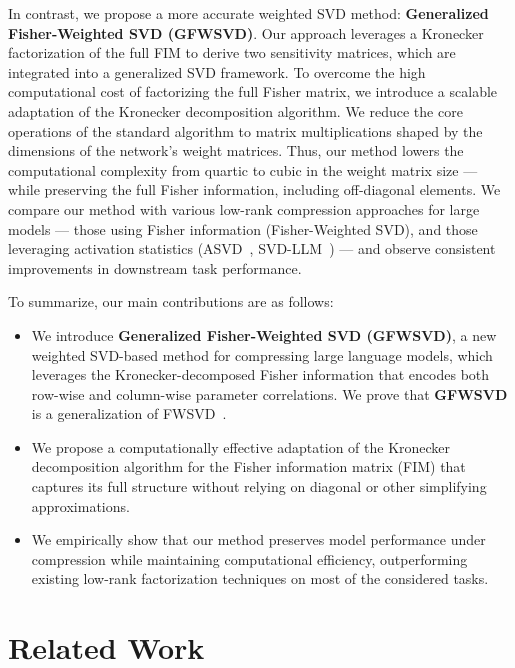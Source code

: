 \documentclass{article}
\begin{document}
In contrast, we propose a more accurate weighted SVD method: \textbf{Generalized Fisher-Weighted SVD (GFWSVD)}. Our approach leverages a Kronecker factorization of the full FIM to derive two sensitivity matrices, which are integrated into a generalized SVD framework. To overcome the high computational cost of factorizing the full Fisher matrix, we introduce a scalable adaptation of the Kronecker decomposition algorithm. We reduce the core operations of the standard algorithm to matrix multiplications shaped by the dimensions of the network's weight matrices. Thus, our method lowers the computational complexity from quartic to cubic in the weight matrix size — while preserving the full Fisher information, including off-diagonal elements. We compare our method with various low-rank compression approaches for large models — those using Fisher information (Fisher-Weighted SVD), and those leveraging activation statistics (ASVD~\cite{asvd}, SVD-LLM~\cite{svdllm}) — and observe consistent improvements in downstream task performance.

To summarize, our main contributions are as follows:

\begin{itemize}
\item We introduce \textbf{Generalized Fisher-Weighted SVD (GFWSVD)}, a new weighted SVD-based method for compressing large language models, which leverages the Kronecker-decomposed Fisher information that encodes both row-wise and column-wise parameter correlations. We prove that \textbf{GFWSVD} is a generalization of FWSVD~\cite{FWSVD}.

\item We propose a computationally effective adaptation of the Kronecker decomposition algorithm for the Fisher information matrix (FIM) that captures its full structure without relying on diagonal or other simplifying approximations.

\item We empirically show that our method preserves model performance under compression while maintaining computational efficiency, outperforming existing low-rank factorization techniques on most of the considered tasks.
\end{itemize}

\section{Related Work}
\end{document}
